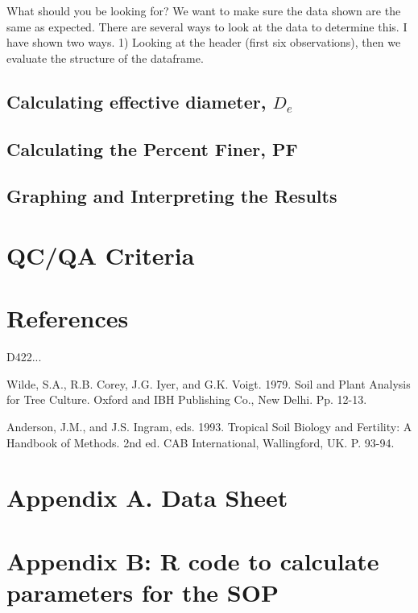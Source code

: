\documentclass[12pt]{../SOP3_alpha}
\begin{document}
What should you be looking for?  We want to make sure the data shown are the same as expected. There are several ways to look at the data to determine this. I have shown two ways. 1) Looking at the header (first six observations), then we evaluate the structure of the dataframe.
 
\subsection{Calculating effective diameter, $D_e$}


\subsection{Calculating the Percent Finer, PF}


\subsection{Graphing and Interpreting the Results}

\section{QC/QA Criteria}

\section{References}

\NP D422...

\NP Wilde, S.A., R.B. Corey, J.G. Iyer, and G.K. Voigt.  1979.  Soil and Plant Analysis for Tree Culture.  Oxford and IBH Publishing Co., New Delhi.  Pp. 12-13.

\NP Anderson, J.M., and J.S. Ingram, eds.  1993.  Tropical Soil Biology and Fertility:  A Handbook of Methods. 2nd ed.  CAB International, Wallingford, UK.  P. 93-94.

\section{Appendix A. Data Sheet}




\newpage
\section{Appendix B: R code to calculate parameters for the SOP}

% 	
\end{document}
